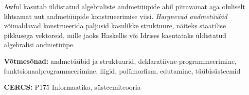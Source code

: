 \documentclass[12pt]{article}
\begin{document}
  Awful kasutab üldistatud algebraliste andmetüüpide abil piiravamat aga oluliselt lihtsamat uut andmetüüpide konstrueerimise viisi. \textit{Hargnevad andmetüübid} võimaldavad konstrueerida paljusid kasulikke struktuure, näiteks staatilise pikkusega vektoreid, mille jaoks Haskellis või Idrises kasutataks üldistatud algebralisi andmetüüpe.

  \vspace*{1ex}

  \noindent
  \textbf{Võtmesõnad:} andmetüübid ja struktuurid, deklaratiivne programmeerimine, funktsionaalprogrammeerimine, liigid, polümorfism, edutamine, tüübisüsteemid

  \vspace*{1ex}

  \noindent
  \textbf{CERCS:} P175 Informaatika, süsteemiteooria

  \vspace*{3ex}
\end{document}
